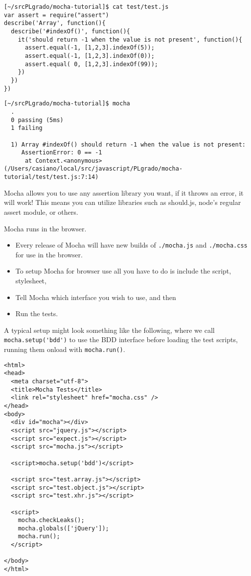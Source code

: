 \begin{verbatim}
[~/srcPLgrado/mocha-tutorial]$ cat test/test.js 
var assert = require("assert")
describe('Array', function(){
  describe('#indexOf()', function(){
    it('should return -1 when the value is not present', function(){
      assert.equal(-1, [1,2,3].indexOf(5));
      assert.equal(-1, [1,2,3].indexOf(0));
      assert.equal( 0, [1,2,3].indexOf(99));
    })
  })
})
\end{verbatim}

\begin{verbatim}
[~/srcPLgrado/mocha-tutorial]$ mocha
  .
  0 passing (5ms)
  1 failing

  1) Array #indexOf() should return -1 when the value is not present:
     AssertionError: 0 == -1
      at Context.<anonymous> (/Users/casiano/local/src/javascript/PLgrado/mocha-tutorial/test/test.js:7:14)
\end{verbatim}

Mocha allows you to use any assertion library you want, if it throws
an error, it will work! This means you can utilize libraries such as
should.js, node's regular assert module, or others. 



Mocha runs in the browser. 

\begin{itemize}
\item
Every release of Mocha will have new builds
of \verb|./mocha.js| and \verb|./mocha.css| for use in the browser. 

\item
To setup Mocha
for browser use all you have to do is include the script, stylesheet,
\item
Tell Mocha which interface you wish to use, and then 
\item
Run the tests. 
\end{itemize}
A
typical setup might look something like the following, where we call
\verb|mocha.setup('bdd')| to use the BDD interface before loading the test
scripts, running them onload with \verb|mocha.run()|.

\begin{verbatim}
<html>
<head>
  <meta charset="utf-8">
  <title>Mocha Tests</title>
  <link rel="stylesheet" href="mocha.css" />
</head>
<body>
  <div id="mocha"></div>
  <script src="jquery.js"></script>
  <script src="expect.js"></script>
  <script src="mocha.js"></script>

  <script>mocha.setup('bdd')</script>

  <script src="test.array.js"></script>
  <script src="test.object.js"></script>
  <script src="test.xhr.js"></script>

  <script>
    mocha.checkLeaks();
    mocha.globals(['jQuery']);
    mocha.run();
  </script>

</body>
</html>
\end{verbatim}

